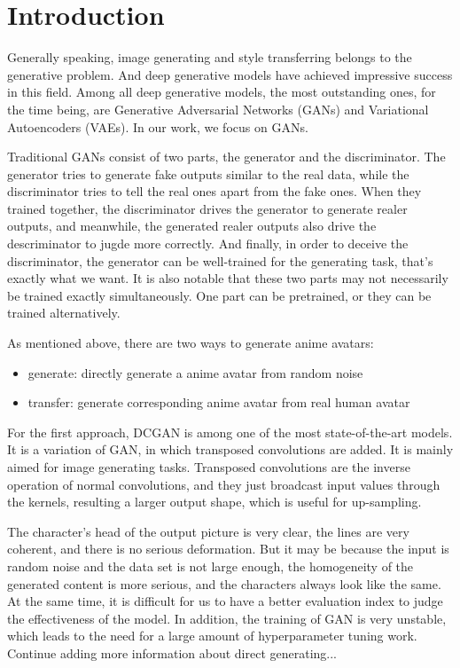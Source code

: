 \documentclass[10pt,twocolumn,letterpaper]{article}
\begin{document}
\section{Introduction}

Generally speaking, image generating and style transferring belongs to the
generative problem. And deep generative models have achieved impressive success
in this field. Among all deep generative models, the most outstanding ones, for
the time being, are Generative Adversarial Networks (GANs) and Variational
Autoencoders (VAEs). In our work, we focus on GANs.

Traditional GANs consist of two parts, the generator and the discriminator. The
generator tries to generate fake outputs similar to the real data, while the
discriminator tries to tell the real ones apart from the fake ones. When they
trained together, the discriminator drives the generator to generate realer
outputs, and meanwhile, the generated realer outputs also drive the
descriminator to jugde more correctly. And finally, in order to deceive the
discriminator, the generator can be well-trained for the generating task, that's
exactly what we want. It is also notable that these two parts may not
necessarily be trained exactly simultaneously. One part can be pretrained, or
they can be trained alternatively.

As mentioned above, there are two ways to generate anime avatars:

\begin{itemize}[noitemsep, topsep=0pt]
   \item generate: directly generate a anime avatar from random noise
   \item transfer: generate corresponding anime avatar from real human avatar
\end{itemize}

For the first approach, DCGAN is among one of the most state-of-the-art models.
It is a variation of GAN, in which transposed convolutions are added. It is
mainly aimed for image generating tasks. Transposed convolutions are the inverse
operation of normal convolutions, and they just broadcast input values through
the kernels, resulting a larger output shape, which is useful for up-sampling.

The character's head of the output picture is very clear, the lines are very coherent, and there
is no serious deformation. But it may be because the input is random noise and the data
set is not large enough, the homogeneity of the generated content is more serious, and the
characters always look like the same. At the same time, it is difficult for us to have a better
evaluation index to judge the effectiveness of the model. In addition, the training of GAN
is very unstable, which leads to the need for a large amount of hyperparameter tuning work.
{\color{red}Continue adding more information about direct generating...}
\end{document}
